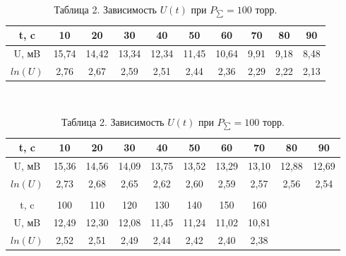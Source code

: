 \begin{table}[h]
	\caption{Зависимость $U(t)$ при $P_{\sum} = 35 $ торр.}
\begin{tabular}{| c | c | c | c | c | c | c | c | c | c |}
\hline
t, c & 10 & 20 & 30 & 40 & 50 & 60 & 70 & 80 & 90 \\ \hline
U, мB & 15,74 & 14,42 & 13,34 & 12,34 & 11,45 & 10,64 & 9,91 & 9,18 & 8,48 \\ \hline
$ln(U)$ & 2,76 & 2,67 & 2,59 & 2,51 & 2,44 & 2,36 & 2,29 & 2,22 & 2,13 \\ \hline
\end{tabular}\\

	\caption{Таблица 2. Зависимость $U(t)$ при $P_{\sum} = 100 $ торр.}
\begin{tabular}{| c | c | c | c | c | c | c | c | c | c |}
\hline
t, c & 10 & 20 & 30 & 40 & 50 & 60 & 70 & 80 & 90  \\ \hline
U, мB & 15,36 & 14,56 & 14,09 & 13,75 & 13,52 & 13,29 & 13,10 & 12,88 & 12,69  \\ \hline
$ln(U)$ & 2,73 & 2,68 & 2,65 & 2,62 & 2,60 & 2,59 & 2,57 & 2,56 & 2,54  \\ \hline
\\  \hline
t, c & 100 & 110 & 120 & 130 & 140 & 150 & 160 &&  \\ \hline
U, мB & 12,49 & 12,30 & 12,08 & 11,45 & 11,24 & 11,02 & 10,81 && \\ \hline
$ln(U)$ & 2,52 & 2,51 & 2,49 & 2,44 & 2,42 & 2,40 & 2,38 && \\ \hline
\end{tabular}\\
\end{table}

